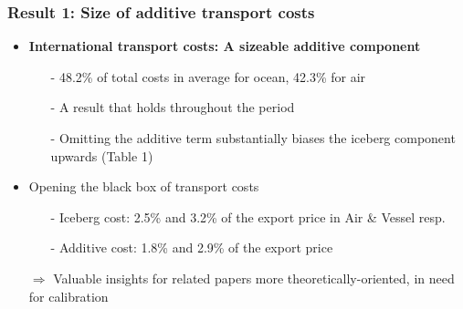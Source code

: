 \documentclass[10 pt,Helvetica, french]{beamer}
\begin{document}
\begin{frame}[label=slide_result1]
\frametitle{Result 1: Size of additive transport costs \hyperlink{app_result1}{} }
\begin{itemize}
\item \textbf{International transport costs: A sizeable additive component}  \vspace{0.2cm}
\begin{itemize}
\item[-] 48.2\% of total costs in average for ocean, 42.3\% for air  \vspace{0.1cm}
\item[-] A result that holds throughout the period \hyperlink{slide_fig1}{} \vspace{0.1cm}
\item[-] Omitting the additive term substantially biases the iceberg component upwards (Table 1) \vspace{0.2cm}
\end{itemize}
\item Opening the black box of transport costs \vspace{0.1cm}
\begin{itemize}
\item[-] Iceberg cost: 2.5\% and 3.2\% of the export price in Air \& Vessel resp.  \vspace{0.1cm}
\item[-] Additive cost: 1.8\% and 2.9\% of the export price \vspace{0.1cm}
\end{itemize}
\item[$\Rightarrow$] Valuable insights for related papers more theoretically-oriented, in need for calibration
\end{itemize}
\end{frame}
\end{document}
